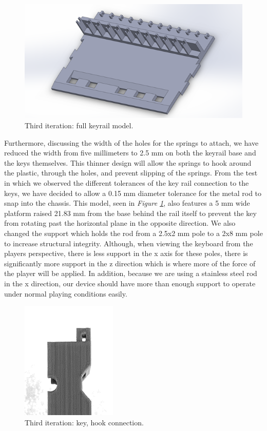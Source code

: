 \begin{figure}[h!]
  \centering
  \includegraphics[width=0.9\linewidth]{image/BaseModel3.png}
  \caption{Third iteration: full keyrail model.}
  \label{fig:base_model3}
\end{figure}

Furthermore, discussing the width of the holes for the springs to attach, we have reduced the width from five millimeters to 2.5 mm on both the keyrail base and the keys themselves. This thinner design will allow the springs to hook around the plastic, through the holes, and prevent slipping of the springs. From the test in which we observed the different tolerances of the key rail connection to the keys, we have decided to allow a 0.15 mm diameter tolerance for the metal rod to snap into the chassis. This model, seen in \textit{Figure \ref{fig:base_model3}}, also features a 5 mm wide platform raised 21.83 mm from the base behind the rail itself to prevent the key from rotating past the horizontal plane in the opposite direction. We also changed the support which holds the rod from a 2.5x2 mm pole to a 2x8 mm pole to increase structural integrity. Although, when viewing the keyboard from the players perspective, there is less support in the x axis for these poles, there is significantly more support in the z direction which is where more of the force of the player will be applied. In addition, because we are using a stainless steel rod in the x direction, our device should have more than enough support to operate under normal playing conditions easily.

\begin{figure}[h!]
  \centering
  \includegraphics[width=0.25\linewidth]{image/Print5.png}
  \caption{Third iteration: key, hook connection.}
  \label{fig:print5}
\end{figure}

